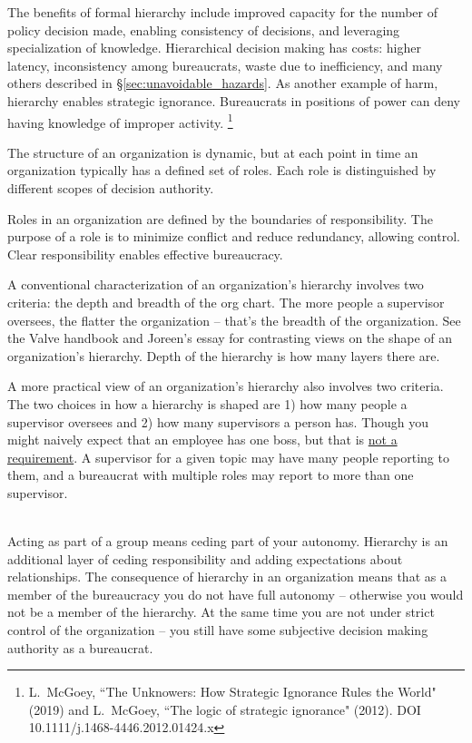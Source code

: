 The benefits of formal hierarchy include improved capacity for the number of policy decision made, enabling consistency of decisions, and leveraging specialization of knowledge. 
Hierarchical decision making has costs: higher latency, inconsistency among bureaucrats, waste due to inefficiency, and many others described in \S\ref{sec:unavoidable_hazards}. As another example of harm, hierarchy enables strategic ignorance. Bureaucrats in positions of power can deny having knowledge of improper activity. 
\footnote{L.~McGoey, ``The Unknowers: How Strategic Ignorance Rules the World" (2019)
and 
L.~McGoey, ``The logic of strategic ignorance" (2012). DOI 
10.1111/j.1468-4446.2012.01424.x
}


The structure of an organization is dynamic, but at each point in time an organization typically has a defined set of roles. Each role is distinguished by different scopes of decision authority. 




Roles in an organization are defined by the boundaries of responsibility. The purpose of a role is to minimize conflict and reduce redundancy, allowing control. Clear responsibility enables effective bureaucracy. 


A conventional characterization of an organization's hierarchy involves two criteria: the depth and breadth of the org chart.
The more people a supervisor oversees, the flatter the organization -- that's the breadth of the organization. See the Valve handbook \cite{2012_Valve} and Joreen's essay \cite{1972_Joreen} for contrasting views on the shape of an organization's hierarchy. Depth of the hierarchy is how many layers there are.

A more practical view of an organization's hierarchy also involves two criteria. The two choices in how a hierarchy is shaped are 
1) how many people a supervisor oversees and 
2) how many supervisors a person has. 
Though you might naively expect that an employee has one boss, but that is \href{https://en.wikipedia.org/wiki/Matrix_management}{not a requirement}. A supervisor for a given topic may have many people reporting to them, and a bureaucrat with multiple roles may report to more than one supervisor.

\ \\

Acting as part of a group means ceding part of your autonomy. Hierarchy is an additional layer of ceding responsibility and adding expectations about relationships.
The consequence of hierarchy in an organization means that as a member of the bureaucracy you do not have full autonomy -- otherwise you would not be a member of the hierarchy. At the same time you are not under strict control of the organization -- you still have some subjective decision making authority as a bureaucrat.

